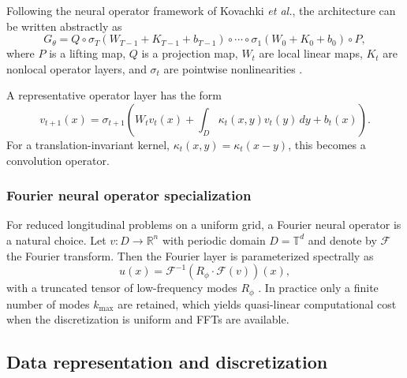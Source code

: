 \documentclass[11pt,a4paper]{article}
\begin{document}
\begin{sloppypar}
Following the neural operator framework of Kovachki \emph{et al.}, the architecture can be written abstractly as
\begin{equation}
 G_\theta
 =
 Q \circ
 \sigma_T(W_{T-1}+K_{T-1}+b_{T-1})
 \circ \cdots \circ
 \sigma_1(W_0 + K_0 + b_0)
 \circ P,
 \label{eq:neural-operator-abstract}
\end{equation}
where $P$ is a lifting map, $Q$ is a projection map, $W_t$ are local linear maps, $K_t$ are nonlocal operator layers, and $\sigma_t$ are pointwise nonlinearities \cite{kovachki_neural_nodate}.

A representative operator layer has the form
\begin{equation}
 v_{t+1}(x)
 =
 \sigma_{t+1}
 \left(
 W_t v_t(x)
 + \int_D \kappa_t(x,y) v_t(y)\,dy
 + b_t(x)
 \right).
 \label{eq:operator-layer}
\end{equation}
For a translation-invariant kernel, $\kappa_t(x,y)=\kappa_t(x-y)$, this becomes a convolution operator.

\subsubsection{Fourier neural operator specialization}
\label{subsubsec:fno-specialization}

For reduced longitudinal problems on a uniform grid, a Fourier neural operator is a natural choice. Let $v : D \to \mathbb{R}^n$ with periodic domain $D=\mathbb{T}^d$ and denote by $\mathcal{F}$ the Fourier transform. Then the Fourier layer is parameterized spectrally as
\begin{equation}
 u(x) = \mathcal{F}^{-1}\!\left(R_\phi \cdot \mathcal{F}(v)\right)(x),
 \label{eq:fno-spectral-layer}
\end{equation}
with a truncated tensor of low-frequency modes $R_\phi$ \cite{kovachki_neural_nodate}. In practice only a finite number of modes $k_{\max}$ are retained, which yields quasi-linear computational cost when the discretization is uniform and FFTs are available.

\subsection{Data representation and discretization}
\label{subsubsec:data-representation}


\end{sloppypar}
\end{document}
